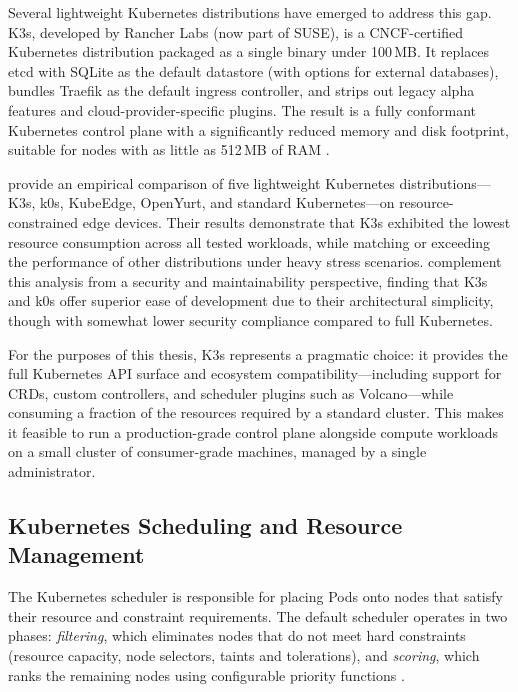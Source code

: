 Several lightweight Kubernetes distributions have emerged to address this gap. K3s, developed by Rancher Labs (now part of SUSE), is a CNCF-certified Kubernetes distribution packaged as a single binary under 100\,MB. It replaces etcd with SQLite as the default datastore (with options for external databases), bundles Traefik as the default ingress controller, and strips out legacy alpha features and cloud-provider-specific plugins. The result is a fully conformant Kubernetes control plane with a significantly reduced memory and disk footprint, suitable for nodes with as little as 512\,MB of RAM \citep{yakubov2025comparative}.

\citet{yakubov2025comparative} provide an empirical comparison of five lightweight Kubernetes distributions---K3s, k0s, KubeEdge, OpenYurt, and standard Kubernetes---on resource-constrained edge devices. Their results demonstrate that K3s exhibited the lowest resource consumption across all tested workloads, while matching or exceeding the performance of other distributions under heavy stress scenarios. \citet{yakubov2025comparativeb} complement this analysis from a security and maintainability perspective, finding that K3s and k0s offer superior ease of development due to their architectural simplicity, though with somewhat lower security compliance compared to full Kubernetes.

For the purposes of this thesis, K3s represents a pragmatic choice: it provides the full Kubernetes API surface and ecosystem compatibility---including support for CRDs, custom controllers, and scheduler plugins such as Volcano---while consuming a fraction of the resources required by a standard cluster. This makes it feasible to run a production-grade control plane alongside compute workloads on a small cluster of consumer-grade machines, managed by a single administrator.

\subsection{Kubernetes Scheduling and Resource Management}

The Kubernetes scheduler is responsible for placing Pods onto nodes that satisfy their resource and constraint requirements. The default scheduler operates in two phases: \emph{filtering}, which eliminates nodes that do not meet hard constraints (resource capacity, node selectors, taints and tolerations), and \emph{scoring}, which ranks the remaining nodes using configurable priority functions \citep{hightower2019kubernetes}.

